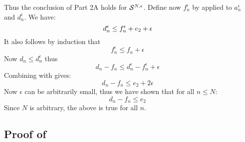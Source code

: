 Thus the conclusion of Part 2A holds for $\mathcal S^{N,\epsilon}$.
Define now $f_n^{\epsilon}$ by  applied to
$a_n^{\epsilon}$ and $d_n^{\epsilon}$. We have:
\begin{equation}\mylabel{eq-kjas823}
 d_n^{\epsilon} \leq f_n^{\epsilon} + e_2 + \epsilon
\end{equation}
It also follows by induction that
$$
f_n^{\epsilon} \leq f_n + \epsilon
$$
Now $d_n\leq d_n^{\epsilon}$ thus
$$d_n - f_n \leq d_n^{\epsilon} - f_n^{\epsilon} + \epsilon
$$
Combining with  gives:
$$
d_n - f_n \leq e_2 + 2\epsilon
$$
Now $\epsilon$ can be arbitrarily small, thus we have shown
that for all $n\leq N$:
$$
d_n - f_n \leq e_2
$$
Since $N$ is arbitrary, the above is true for all $n$.


\subsection{Proof of }
